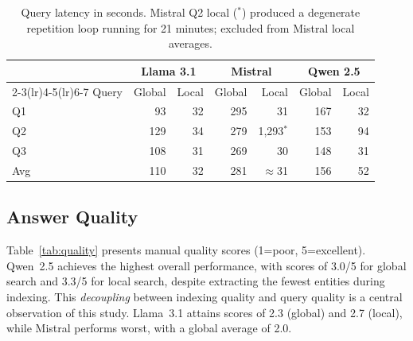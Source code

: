 \documentclass{article}
\begin{document}
\begin{table}[h]
  \caption{Query latency in seconds. Mistral Q2 local (${}^{*}$) produced a degenerate repetition loop running for 21 minutes; excluded from Mistral local averages.}
  \label{tab:latency}
  \centering
  \small
  \begin{tabular}{lrrrrrr}
    \toprule
    & \multicolumn{2}{c}{Llama 3.1} & \multicolumn{2}{c}{Mistral} & \multicolumn{2}{c}{Qwen 2.5} \\
    \cmidrule(lr){2-3}\cmidrule(lr){4-5}\cmidrule(lr){6-7}
    Query & Global & Local & Global & Local            & Global & Local \\
    \midrule
    Q1    & 93     & 32    & 295    & 31               & 167    & 32    \\
    Q2    & 129    & 34    & 279    & 1{,}293$^{*}$    & 153    & 94    \\
    Q3    & 108    & 31    & 269    & 30               & 148    & 31    \\
    \midrule
    Avg   & 110    & 32    & 281    & $\approx$31      & 156    & 52    \\
    \bottomrule
  \end{tabular}
\end{table}

\subsection{Answer Quality}

Table~\ref{tab:quality} presents manual quality scores (1=poor, 5=excellent). Qwen~2.5 achieves the highest overall performance, with scores of 3.0/5 for global search and 3.3/5 for local search, despite extracting the fewest entities during indexing. This \emph{decoupling} between indexing quality and query quality is a central observation of this study. Llama~3.1 attains scores of 2.3 (global) and 2.7 (local), while Mistral performs worst, with a global average of 2.0.
\end{document}
